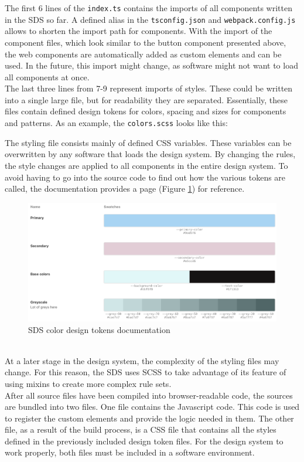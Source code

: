 
The first 6 lines of the \texttt{index.ts} contains the imports of all components written in the \ac{SDS} so far. A defined alias in the \texttt{tsconfig.json} and \texttt{webpack.config.js} allows to shorten the import path for components. With the import of the component files, which look similar to the button component presented above, the web components are automatically added as custom elements and can be used. In the future, this import might change, as software might not want to load all components at once. \\
The last three lines from 7-9 represent imports of styles. These could be written into a single large file, but for readability they are separated. Essentially, these files contain defined design tokens for colors, spacing and sizes for components and patterns. As an example, the \texttt{colors.scss} looks like this:

The styling file consists mainly of defined \ac{CSS} variables. These variables can be overwritten by any software that loads the design system. By changing the rules, the style changes are applied to all components in the entire design system. To avoid having to go into the source code to find out how the various tokens are called, the documentation provides a page (Figure \ref{sds_color_design_tokens}) for reference.
\begin{figure}[htbp]
    \centerline{\includegraphics[width=\linewidth]{images/color_design_tokens.png}}
    \caption{\ac{SDS} color design tokens documentation}
    \label{sds_color_design_tokens}
\end{figure} \\
At a later stage in the design system, the complexity of the styling files may change. For this reason, the \ac{SDS} uses \ac{SCSS} to take advantage of its feature of using mixins to create more complex rule sets.\citep{scss_sass_nodate} \\
After all source files have been compiled into browser-readable code, the sources are bundled into two files. One file contains the Javascript code. This code is used to register the custom elements and provide the logic needed in them. The other file, as a result of the build process, is a \ac{CSS} file that contains all the styles defined in the previously included design token files. For the design system to work properly, both files must be included in a software environment. \\

